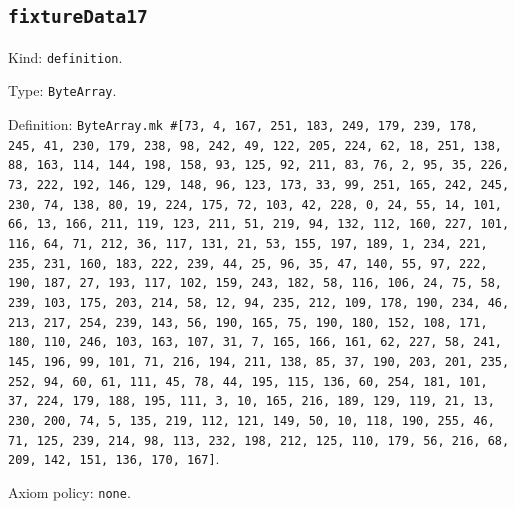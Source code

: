 \documentclass[11pt]{article}
\begin{document}
\subsection*{\texttt{fixtureData17}}
\noindent Kind: \texttt{definition}.\par
\noindent Type: \texttt{ByteArray}.\par
\noindent Definition: \texttt{ByteArray.mk \#[73, 4, 167, 251, 183, 249, 179, 239, 178, 245, 41, 230, 179, 238, 98, 242, 49, 122, 205, 224, 62, 18, 251, 138, 88, 163, 114, 144, 198, 158, 93, 125, 92, 211, 83, 76, 2, 95, 35, 226, 73, 222, 192, 146, 129, 148, 96, 123, 173, 33, 99, 251, 165, 242, 245, 230, 74, 138, 80, 19, 224, 175, 72, 103, 42, 228, 0, 24, 55, 14, 101, 66, 13, 166, 211, 119, 123, 211, 51, 219, 94, 132, 112, 160, 227, 101, 116, 64, 71, 212, 36, 117, 131, 21, 53, 155, 197, 189, 1, 234, 221, 235, 231, 160, 183, 222, 239, 44, 25, 96, 35, 47, 140, 55, 97, 222, 190, 187, 27, 193, 117, 102, 159, 243, 182, 58, 116, 106, 24, 75, 58, 239, 103, 175, 203, 214, 58, 12, 94, 235, 212, 109, 178, 190, 234, 46, 213, 217, 254, 239, 143, 56, 190, 165, 75, 190, 180, 152, 108, 171, 180, 110, 246, 103, 163, 107, 31, 7, 165, 166, 161, 62, 227, 58, 241, 145, 196, 99, 101, 71, 216, 194, 211, 138, 85, 37, 190, 203, 201, 235, 252, 94, 60, 61, 111, 45, 78, 44, 195, 115, 136, 60, 254, 181, 101, 37, 224, 179, 188, 195, 111, 3, 10, 165, 216, 189, 129, 119, 21, 13, 230, 200, 74, 5, 135, 219, 112, 121, 149, 50, 10, 118, 190, 255, 46, 71, 125, 239, 214, 98, 113, 232, 198, 212, 125, 110, 179, 56, 216, 68, 209, 142, 151, 136, 170, 167]}.\par
\noindent Axiom policy: \texttt{none}.\par
\end{document}
